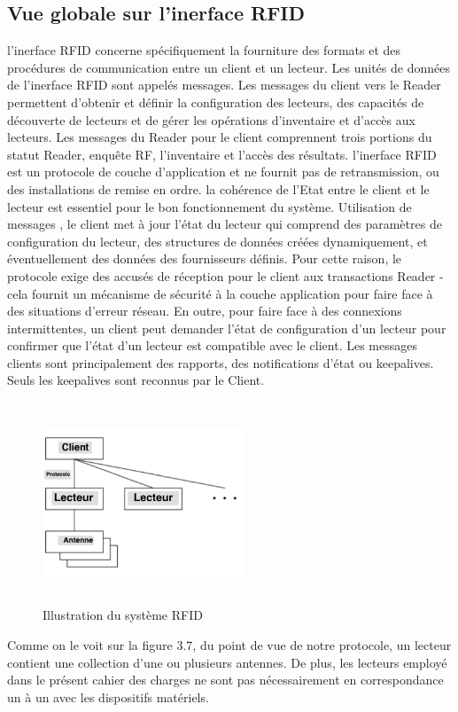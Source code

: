 \documentclass[11pt, a4paper, twoside]{book}
\begin{document}
\subsection{Vue globale sur l'inerface RFID}
l'inerface RFID concerne spécifiquement la fourniture des formats et des procédures de communication entre un client et un lecteur. Les unités de données de l'inerface RFID sont appelés messages. Les messages du client vers le Reader permettent d'obtenir et définir la configuration des lecteurs, des capacités de découverte de lecteurs et de gérer les opérations d'inventaire et d'accès aux lecteurs. Les messages du Reader pour le client comprennent trois portions du statut Reader, enquête RF, l'inventaire et l'accès des résultats. l'inerface RFID est un protocole de couche d'application et ne fournit pas de retransmission, ou des installations de remise en ordre. la cohérence de l'Etat entre le client et le lecteur est essentiel pour le bon fonctionnement du système. Utilisation de messages , le client met à jour l'état du lecteur qui comprend des paramètres de configuration du lecteur, des structures de données créées dynamiquement, et éventuellement des données des fournisseurs définis. Pour cette raison, le protocole exige des accusés de réception pour le client aux transactions Reader - cela fournit un mécanisme de sécurité à la couche application pour faire face à des situations d'erreur réseau. En outre, pour faire face à des connexions intermittentes, un client peut demander l'état de configuration d'un lecteur pour confirmer que l'état d'un lecteur est compatible avec le client. Les messages clients sont principalement des rapports, des notifications d'état ou keepalives. Seuls les keepalives sont reconnus par le Client.
\begin{figure}[!h]
\centering
\includegraphics[width=6cm,height=6cm]{lim}
\caption{Illustration du système RFID}
\end{figure}
Comme on le voit sur la figure 3.7, du point de vue de notre protocole, un lecteur contient une collection d'une ou
plusieurs antennes. De plus, les lecteurs employé dans le présent cahier des charges ne sont pas nécessairement en
correspondance un à un avec les dispositifs matériels.
\end{document}
